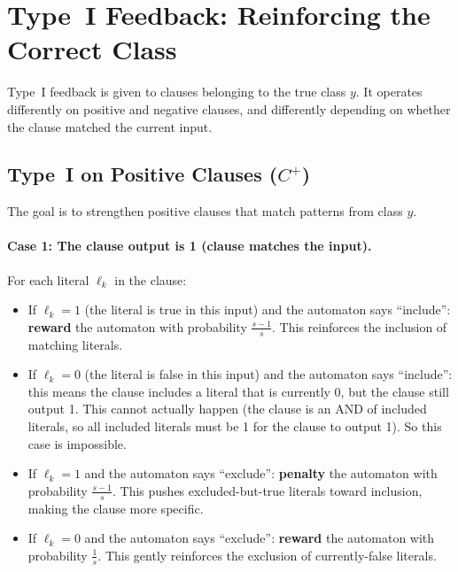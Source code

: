 \section{Type~I Feedback: Reinforcing the Correct Class}
\label{sec:type1}

Type~I feedback is given to clauses belonging to the true class $y$.
It operates differently on positive and negative clauses, and
differently depending on whether the clause matched the current input.

\subsection{Type~I on Positive Clauses ($C^+$)}

The goal is to strengthen positive clauses that match patterns from
class $y$.

\paragraph{Case 1: The clause output is 1 (clause matches the input).}

For each literal $\ell_k$ in the clause:
\begin{itemize}
  \item If $\ell_k = 1$ (the literal is true in this input) and the
    automaton says ``include'': \textbf{reward} the automaton with
    probability $\frac{s-1}{s}$. This reinforces the inclusion of
    matching literals.
  \item If $\ell_k = 0$ (the literal is false in this input) and the
    automaton says ``include'': this means the clause includes a
    literal that is currently 0, but the clause still output 1. This
    cannot actually happen (the clause is an AND of included
    literals, so all included literals must be 1 for the clause to
    output 1). So this case is impossible.
  \item If $\ell_k = 1$ and the automaton says ``exclude'':
    \textbf{penalty} the automaton with probability $\frac{s-1}{s}$.
    This pushes excluded-but-true literals toward inclusion,
    making the clause more specific.
  \item If $\ell_k = 0$ and the automaton says ``exclude'':
    \textbf{reward} the automaton with probability $\frac{1}{s}$.
    This gently reinforces the exclusion of currently-false literals.
\end{itemize}

